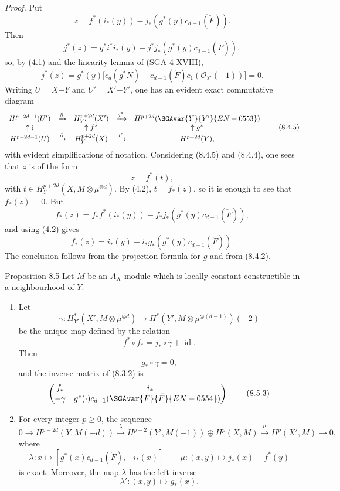 \emph{Proof.} Put
\[
z=f^*(i_*(y))-j_*(g^*(y)c_{d-1}(\check F)).
\]
Then
\[
j^*(z)=g^*i^*i_*(y)-j^*j_*(g^*(y)c_{d-1}(\check F)),
\]
so, by (4.1) and the linearity lemma of (SGA 4 XVIII),
\[
j^*(z)=g^*(y)\bigl[c_d(g^*\check N)-c_{d-1}(\check F)c_1(\mathcal O_{Y'}(-1))\bigr]=0.
\tag{8.4.4}
\]
Writing $U=X\mathbin{\dot{-}}Y$ and $U'=X'\mathbin{\dot{-}}Y'$, one has an evident exact commutative diagram
\[
\begin{array}{ccccc}
H^{p+2d-1}(U')&\xrightarrow{\partial}&H^{p+2d}_{Y'}(X')&\xrightarrow{j^*}&H^{p+2d}(\SGAvar{Y}{Y'}{EN-0553})\\
\uparrow\wr&&\uparrow f^*&&\uparrow g^*\\
H^{p+2d-1}(U)&\xrightarrow{\partial}&H_Y^{p+2d}(X)&\xrightarrow{i^*}&H^{p+2d}(Y),
\end{array}
\tag{8.4.5}
\]
with evident simplifications of notation. Considering (8.4.5) and (8.4.4), one sees that $z$ is of the form
\[
z=f^*(t),
\]
with $t\in H_Y^{p+2d}(X,M\otimes\mu^{\otimes d})$. By (4.2), $t=f_*(z)$, so it is enough to see that $f_*(z)=0$. But
\[
f_*(z)=f_*f^*(i_*(y))-f_*j_*(g^*(y)c_{d-1}(\check F)),
\]
and using (4.2) gives
\[
f_*(z)=i_*(y)-i_*g_*(g^*(y)c_{d-1}(\check F)).
\]
The conclusion follows from the projection formula for $g$ and from (8.4.2).

\begin{statement}{Proposition 8.5}
Let $M$ be an $A_X$-module which is locally constant constructible in a neighbourhood of $Y$.
\begin{enumerate}[label=\alph*)]
\item Let
\[
\gamma:H_{Y'}^*(X',M\otimes\mu^{\otimes d})\to
H^*(Y',M\otimes\mu^{\otimes(d-1)})(-2)
\]
be the unique map defined by the relation
\[
f^*\circ f_* = j_*\circ\gamma+\operatorname{id}.
\tag{8.5.1}
\]
Then
\[
g_*\circ\gamma=0,
\tag{8.5.2}
\]
and the inverse matrix of (8.3.2) is
\[
\begin{pmatrix}
f_*&-i_*\\
-\gamma&g^*(\cdot)c_{d-1}(\SGAvar{ F}{\check F}{EN-0554})
\end{pmatrix}.
\tag{8.5.3}
\]
\item For every integer $p\ge0$, the sequence
\[
0\to H^{p-2d}(Y,M(-d))
\xrightarrow{\lambda}
H^{p-2}(Y',M(-1))\oplus H^p(X,M)
\xrightarrow{\mu}
H^p(X',M)\to0,
\]
where
\[
\lambda : x\longmapsto [g^*(x)c_{d-1}(\check F),-i_*(x)]
\qquad
\mu : (x,y)\mapsto j_*(x)+f^*(y)
\]
is exact. Moreover, the map $\lambda$ has the left inverse
\[
\lambda' : (x,y)\longmapsto g_*(x).
\]
\end{enumerate}
\end{statement}

